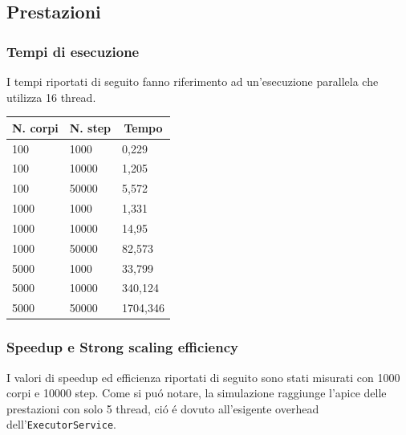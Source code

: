 \documentclass[12pt,a4paper,oneside]{article}
\begin{document}
\begin{center}
\begin{minipage}{.45\textwidth}
{}
		\end{minipage}
	\end{center}
	
	\subsection{Prestazioni}
	\subsubsection{Tempi di esecuzione}
	I tempi riportati di seguito fanno riferimento ad un'esecuzione parallela che utilizza 16 thread.
	\newline
	
	\begin{tabular}{|l|l|l|}
		\hline
		\multicolumn{1}{|c|}{\textbf{N. corpi}} & \multicolumn{1}{c|}{\textbf{N. step}} & \multicolumn{1}{c|}{\textbf{Tempo}} \\ \hline
		100 & 1000 & 0,229 \\ \hline
		100 & 10000 & 1,205 \\ \hline
		100 & 50000 & 5,572 \\ \hline
		1000 & 1000 & 1,331 \\ \hline
		1000 & 10000 & 14,95 \\ \hline
		1000 & 50000 & 82,573 \\ \hline
		5000 & 1000 & 33,799 \\ \hline
		5000 & 10000 & 340,124 \\ \hline
		5000 & 50000 & 1704,346 \\ \hline
	\end{tabular}

	\subsubsection{Speedup e Strong scaling efficiency}
	I valori di speedup ed efficienza riportati di seguito sono stati misurati con 1000 corpi e 10000 step. Come si pu\'o notare, la simulazione raggiunge l'apice delle prestazioni con solo 5 thread, ci\'o \'e dovuto all'esigente overhead dell'\texttt{ExecutorService}.
	
\end{document}
